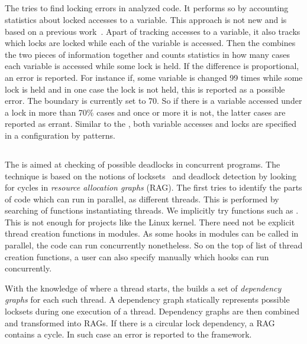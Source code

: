 \subsection{\LC}
The \LC tries to find locking errors in analyzed code. It performs so by
accounting statistics about locked accesses to a variable. This approach is
not new and is based on a previous work~\cite{lockchecker}.  Apart of tracking
accesses to a variable, it also tracks which locks are locked while each
of the variable is accessed. Then the \LC combines the two pieces of
information together and counts statistics in how many cases each variable is
accessed while some lock is held. If the difference is proportional, an error
is reported. For instance if, some variable is changed 99 times while some
lock is held and in one case the lock is not held, this is reported as a
possible error. The boundary is currently set to 70. So if there is a variable
accessed under a lock in more than 70\% cases and once or more it is not, the
latter cases are reported as errant. Similar to the \AC, both variable
accesses and locks are specified in a configuration by patterns.

\subsection{\TC}
The \TC is aimed at checking of possible deadlocks in concurrent programs.
The technique is based on the notions of locksets~\cite{relay} and deadlock
detection by looking for cycles in \emph{resource allocation graphs} (RAG).
The \TC first tries to identify the parts of code which can run in parallel,
as different threads. This is performed by searching of functions
instantiating threads. We implicitly try functions such as
. This is not enough for projects like the Linux kernel.
There need not be explicit thread creation functions in modules. As some hooks
in modules can be called in parallel, the code can run concurrently
nonetheless. So on the top of list of thread creation functions, a user can
also specify manually which hooks can run concurrently.

With the knowledge of where a thread starts, the \TC builds a set of
\emph{dependency graphs} for each such thread. A dependency graph statically
represents possible locksets during one execution of a thread. Dependency
graphs are then combined and transformed into RAGs. If there is a circular
lock dependency, a RAG contains a cycle. In such case an error is reported to
the \stan framework.

